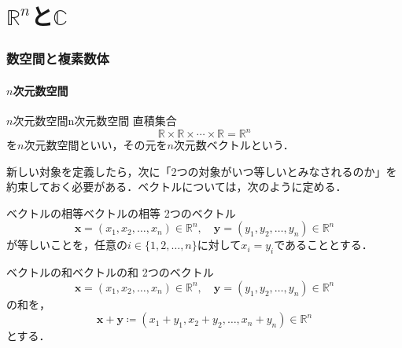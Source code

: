 
\part{\texorpdfstring{$\mathbb{R}^n$と$\mathbb{C}$}{Rn と C}}

\begin{abstract}
この章では，$n$次元数空間 $\mathbb{R}^n$ と複素数体 $\mathbb{C}$ を導入する．まず直積集合として $\mathbb{R}^n$ を定義し，ベクトルの和・スカラー倍・内積といった演算とその性質を確認する．次に，$\mathbb{R}^2$ に加法と乗法を定めることで複素数体 $\mathbb{C}$ を構成し，虚数単位 $i$ が $i^2 = -1$ を満たすことを示す．最後に，$\mathbb{R}^n$ の点列を定義し，点列の収束・コーシー列といった概念が成分ごとの議論に帰着されることを確認する．
\end{abstract}

\draftpart

\section{数空間と複素数体}

\subsection{\texorpdfstring{$n$次元数空間}{n次元数空間}}

\begin{definition}{$n$次元数空間}{n次元数空間}
  直積集合
  \[
    \mathbb{R} \times \mathbb{R} \times \dotsm \times \mathbb{R} = \mathbb{R}^n
  \]
  を$n$次元数空間といい，その元を$n$次元数ベクトルという．
\end{definition}

新しい対象を定義したら，次に「2つの対象がいつ等しいとみなされるのか」を約束しておく必要がある．ベクトルについては，次のように定める．

\begin{definition}{ベクトルの相等}{ベクトルの相等}
  2つのベクトル
  \[
    \bm{x} = (x_1,x_2,\ldots,x_n) \in \mathbb{R}^n,\quad \bm{y} = (y_1,y_2,\ldots,y_n) \in \mathbb{R}^n
  \]
  が等しいことを，任意の$i \in \{ 1, 2 , \ldots ,n \}$に対して$x_i = y _i$であることとする．
\end{definition}

\begin{definition}{ベクトルの和}{ベクトルの和}
  2つのベクトル
  \[
    \bm{x} = (x_1,x_2,\ldots,x_n) \in \mathbb{R}^n,\quad \bm{y} = (y_1,y_2,\ldots,y_n) \in \mathbb{R}^n
  \]
  の和を，
  \[
    \bm{x}+\bm{y} \coloneqq (x_1+y_1,x_2+y_2,\ldots,x_n+y_n) \in \mathbb{R}^n
  \]
  とする．
\end{definition}


